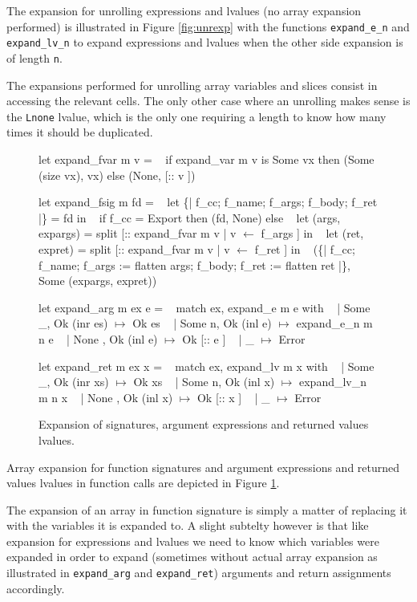 \documentclass{article}
\begin{document}
The expansion for unrolling expressions and lvalues (no array expansion
performed) is illustrated in Figure \ref{fig:unrexp} with the functions
\texttt{expand\_e\_n} and \texttt{expand\_lv\_n} to expand expressions and
lvalues when the other side expansion is of length \texttt{n}.

The expansions performed for unrolling array variables and slices consist in
accessing the relevant cells. The only other case where an unrolling makes sense
is the \texttt{Lnone} lvalue, which is the only one requiring a length to know
how many times it should be duplicated.

\medskip

\begin{figure}[t]
\obeylines\obeyspaces\ttfamily%
let expand\_fvar m v =
~ if expand\_var m v is Some vx then (Some (size vx), vx) else (None, [:: v ])

let expand\_fsig m fd =
~ let \{| f\_cc; f\_name; f\_args; f\_body; f\_ret |\} = fd in
~ if f\_cc = Export then (fd, None) else
~ let (args, expargs) = split [:: expand\_fvar m v | v \(\leftarrow\) f\_args ] in
~ let (ret,  expret)  = split [:: expand\_fvar m v | v \(\leftarrow\) f\_ret  ] in
~ (\{| f\_cc; f\_name; f\_args := flatten args; f\_body; f\_ret := flatten ret |\},
~   Some (expargs, expret))

let expand\_arg m ex e =
~ match ex, expand\_e m e with
~ | Some \_, Ok (inr es)  \(\mapsto\) Ok es
~ | Some n, Ok (inl e)   \(\mapsto\) expand\_e\_n m n e
~ | None  , Ok (inl e)   \(\mapsto\) Ok [:: e ]
~ | \_                    \(\mapsto\) Error

let expand\_ret m ex x =
~ match ex, expand\_lv m x with
~ | Some \_, Ok (inr xs)   \(\mapsto\) Ok xs
~ | Some n, Ok (inl x)    \(\mapsto\) expand\_lv\_n m n x
~ | None  , Ok (inl x)    \(\mapsto\) Ok [:: x ]
~ | \_                     \(\mapsto\) Error
\normalfont%
\caption{Expansion of signatures, argument expressions and returned values lvalues.}\label{fig:sigexp}
\end{figure}

Array expansion for function signatures and argument expressions and
returned values lvalues in function calls are depicted in Figure
\ref{fig:sigexp}.

The expansion of an array in function signature is simply a matter of replacing
it with the variables it is expanded to. A slight subtelty however is that like
expansion for expressions and lvalues we need to know which variables were
expanded in order to expand (sometimes without actual array expansion as
illustrated in \texttt{expand\_arg} and \texttt{expand\_ret}) arguments and
return assignments accordingly.
\end{document}
